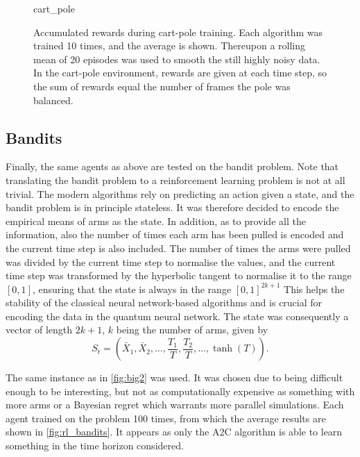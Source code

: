 \begin{figure}
    \centering
    \newcommand{\myoptions}{
        width=10cm,
        height=8cm,
        xlabel={Episode},
        ylabel={Sum of rewards},
        legend cell align=left,
        mystyle,
        legend entries={A2C, DQN, PPO, QNN},
    }
    {cart_pole}
    \caption[
        Accumulated rewards during cart-pole training.
    ]
    {
        Accumulated rewards during cart-pole training.
        Each algorithm was trained 10 times, and the average is shown.
        Thereupon a rolling mean of 20 episodes was used to smooth the still highly noisy data.
        In the cart-pole environment, rewards are given at each time step, so the sum of rewards equal the number of frames the pole was balanced.
    }
    \label{fig:cartpole_training}
\end{figure}

\subsection{Bandits}
Finally, the same agents as above are tested on the bandit problem.
Note that translating the bandit problem to a reinforcement learning problem is not at all trivial.
The modern algorithms rely on predicting an action given a state, and the bandit problem is in principle stateless.
It was therefore decided to encode the empirical means of arms as the state.
In addition, as to provide all the information, also the number of times each arm has been pulled is encoded and the current time step is also included.
The number of times the arms were pulled was divided by the current time step to normalise the values, and the current time step was transformed by the hyperbolic tangent to normalise it to the range $[0, 1]$, ensuring that the state is always in the range $[0, 1]^{2k+1}$
This helps the stability of the classical neural network-based algorithms and is crucial for encoding the data in the quantum neural network.
The state was consequently a vector of length $2k+1$, $k$ being the number of arms, given by
\begin{equation}
    \label{eq:rl_bandit_state}
    S_t = \left(
    \bar{X}_1,
    \bar{X}_2,
    \ldots,
    \frac{T_1}{T},
    \frac{T_2}{T},
    \ldots,
    \tanh(T)
    \right).
\end{equation}

The same instance as in \cref{fig:big2} was used.
It was chosen due to being difficult enough to be interesting, but not as computationally expensive as something with more arms or a Bayesian regret which warrants more parallel simulations.
Each agent trained on the problem 100 times, from which the average results are shown in \cref{fig:rl_bandits}.
It appears as only the A2C algorithm is able to learn something in the time horizon considered.

